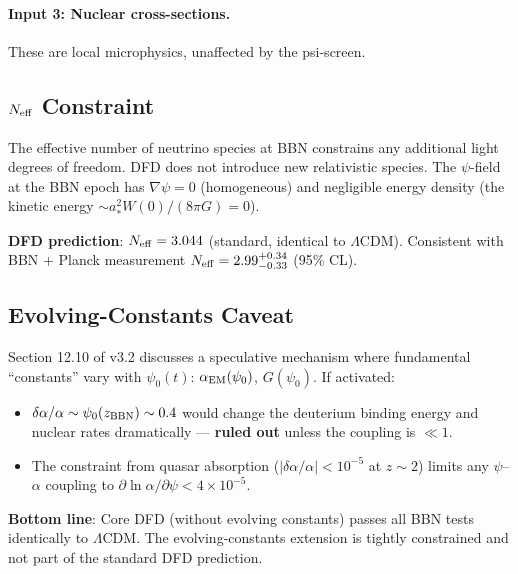 \documentclass[11pt,a4paper]{article}
\newcounter{findingctr}
\newenvironment{finding}[1][]{%
  \refstepcounter{findingctr}%
  \begin{tcolorbox}[colback=blue!3!white, colframe=blue!50!black,
    title=\textbf{Finding \thefindingctr: #1}]
}{%
  \end{tcolorbox}%
}
\newcommand{\LCDM}{$\Lambda$CDM}
\begin{document}
\begin{finding}[\textbf{BBN}: Standard Predictions Preserved]
\paragraph{Input 3: Nuclear cross-sections.}
These are local microphysics, unaffected by the psi-screen.

\subsection*{$N_{\rm eff}$ Constraint}

The effective number of neutrino species at BBN constrains any
additional light degrees of freedom.  DFD does not introduce new
relativistic species.  The $\psi$-field at the BBN epoch has
$\nabla\psi = 0$ (homogeneous) and negligible energy density
(the kinetic energy $\sim a_*^2 W(0)/(8\pi G) = 0$).

\textbf{DFD prediction}: $N_{\rm eff} = 3.044$ (standard, identical
to \LCDM).  Consistent with BBN + Planck measurement
$N_{\rm eff} = 2.99^{+0.34}_{-0.33}$ (95\% CL).

\subsection*{Evolving-Constants Caveat}

Section 12.10 of v3.2 discusses a speculative mechanism where
fundamental ``constants'' vary with $\psi_0(t)$:
$\alpha_{\rm EM}(\psi_0)$, $G(\psi_0)$.  If activated:
\begin{itemize}[nosep]
\item $\delta\alpha/\alpha \sim \psi_0(z_{\rm BBN}) \sim 0.4$
  would change the deuterium binding energy and nuclear rates
  dramatically --- \textbf{ruled out} unless the coupling is
  $\ll 1$.
\item The constraint from quasar absorption ($|\delta\alpha/\alpha|
  < 10^{-5}$ at $z \sim 2$) limits any $\psi$--$\alpha$ coupling
  to $\partial\ln\alpha/\partial\psi < 4 \times 10^{-5}$.
\end{itemize}

\textbf{Bottom line}: Core DFD (without evolving constants) passes
all BBN tests identically to \LCDM.  The evolving-constants
extension is tightly constrained and not part of the standard
DFD prediction.

\end{finding}


\end{document}
